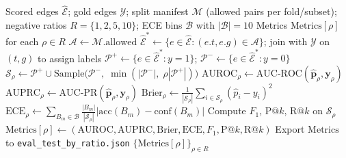 \documentclass{article}
\begin{document}
\begin{algorithm}[H]
\caption{Split-Aware Evaluation with Negative-Ratio Sweeps}
\label{alg:eval}
\begin{algorithmic}[1]
\Require Scored edges $\hat{\mathcal{E}}$; gold edges $\mathcal{Y}$;
         split manifest $\mathcal{M}$ (allowed pairs per fold/subset);
         negative ratios $R = \{1, 2, 5, 10\}$; ECE bins $\mathcal{B}$ with $|\mathcal{B}| = 10$
\Ensure  Metrics $\mathrm{Metrics}[\rho]$ for each $\rho \in R$
\State $\mathcal{A} \leftarrow \mathcal{M}.\mathrm{allowed}$
\State $\hat{\mathcal{E}}^* \leftarrow \{e \in \hat{\mathcal{E}} : (e.t, e.g) \in \mathcal{A}\}$;\;
       join with $\mathcal{Y}$ on $(t,g)$ to assign labels
\State $\mathcal{P}^+ \leftarrow \{e \in \hat{\mathcal{E}}^* : y=1\}$;\;
       $\mathcal{P}^- \leftarrow \{e \in \hat{\mathcal{E}}^* : y=0\}$
  \State $\mathcal{S}_\rho \leftarrow \mathcal{P}^+ \cup \mathrm{Sample}\!\bigl(\mathcal{P}^-,\; \min(|\mathcal{P}^-|,\; \rho|\mathcal{P}^+|)\bigr)$
  \State $\mathrm{AUROC}_\rho \leftarrow \mathrm{AUC\text{-}ROC}(\hat{\mathbf{p}}_{\rho}, \mathbf{y}_\rho)$
  \State $\mathrm{AUPRC}_\rho \leftarrow \mathrm{AUC\text{-}PR}(\hat{\mathbf{p}}_{\rho}, \mathbf{y}_\rho)$
  \State $\mathrm{Brier}_\rho \leftarrow \tfrac{1}{|\mathcal{S}_\rho|}\sum_{i \in \mathcal{S}_\rho} (\hat{p}_i - y_i)^2$
  \State $\mathrm{ECE}_\rho \leftarrow \sum_{B_m \in \mathcal{B}} \tfrac{|B_m|}{|\mathcal{S}_\rho|}\bigl|\mathrm{acc}(B_m) - \mathrm{conf}(B_m)\bigr|$
  \State Compute $F_1$, $\mathrm{P@}k$, $\mathrm{R@}k$ on $\mathcal{S}_\rho$
  \State $\mathrm{Metrics}[\rho] \leftarrow (\mathrm{AUROC}, \mathrm{AUPRC}, \mathrm{Brier}, \mathrm{ECE}, F_1, \mathrm{P@}k, \mathrm{R@}k)$
\EndFor
\State Export $\mathrm{Metrics}$ to \texttt{eval\_test\_by\_ratio.json}
\State \Return $\{\mathrm{Metrics}[\rho]\}_{\rho \in R}$
\end{algorithmic}
\end{algorithm}
\end{document}
